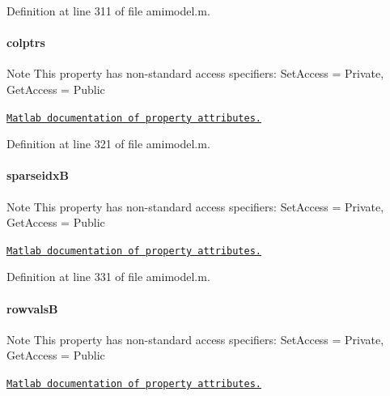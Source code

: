 Definition at line 311 of file amimodel.\+m.

\hypertarget{classamimodel_a887e8a11654afa197d040d8bb10cbb38}{}
\paragraph[{colptrs}]{\setlength{\rightskip}{0pt plus 5cm}colptrs}\label{classamimodel_a887e8a11654afa197d040d8bb10cbb38}
\begin{DoxyNote}{Note}
This property has non-\/standard access specifiers\+: {\ttfamily Set\+Access = Private, Get\+Access = Public} 

\href{http://www.mathworks.com/help/matlab/matlab_oop/property-attributes.html}{\tt Matlab documentation of property attributes.} 
\end{DoxyNote}


Definition at line 321 of file amimodel.\+m.

\hypertarget{classamimodel_adcfae93a688a66f1954d0832f51e4cc0}{}
\paragraph[{sparseidx\+B}]{\setlength{\rightskip}{0pt plus 5cm}sparseidx\+B}\label{classamimodel_adcfae93a688a66f1954d0832f51e4cc0}
\begin{DoxyNote}{Note}
This property has non-\/standard access specifiers\+: {\ttfamily Set\+Access = Private, Get\+Access = Public} 

\href{http://www.mathworks.com/help/matlab/matlab_oop/property-attributes.html}{\tt Matlab documentation of property attributes.} 
\end{DoxyNote}


Definition at line 331 of file amimodel.\+m.

\hypertarget{classamimodel_a1ba81ee0e28fe7c7576911973c82be70}{}
\paragraph[{rowvals\+B}]{\setlength{\rightskip}{0pt plus 5cm}rowvals\+B}\label{classamimodel_a1ba81ee0e28fe7c7576911973c82be70}
\begin{DoxyNote}{Note}
This property has non-\/standard access specifiers\+: {\ttfamily Set\+Access = Private, Get\+Access = Public} 

\href{http://www.mathworks.com/help/matlab/matlab_oop/property-attributes.html}{\tt Matlab documentation of property attributes.} 
\end{DoxyNote}


